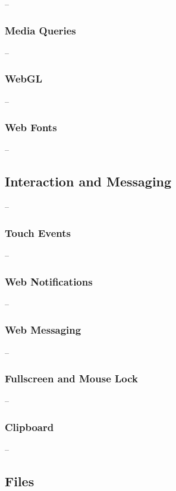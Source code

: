 --

\subsubsection{Media Queries}

--

\subsubsection{WebGL}

--

\subsubsection{Web Fonts}

--

\subsection{Interaction and Messaging}

--

\subsubsection{Touch Events}

--

\subsubsection{Web Notifications}

--

\subsubsection{Web Messaging}

--

\subsubsection{Fullscreen and Mouse Lock}

--

\subsubsection{Clipboard}

--

\subsection{Files}

